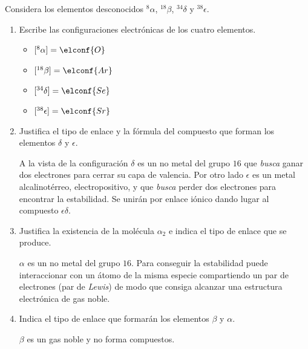 \documentclass[a4paper,14pt]{extarticle}
\begin{document}
\begin{enumerate}
    Considera los elementos desconocidos $^{8}\alpha$, $^{18}\beta$, $^{34}\delta$ y $^{38}\epsilon.$ 
    	\begin{enumerate}[label=\alph*)]
    		\item Escribe las configuraciones electrónicas de los cuatro elementos. 
    		\begin{mdframed}[backgroundcolor=brown!10]  
    				\begin{itemize}
    					\item $[^8\alpha]=\elconf{O}$
    					\item $[^{18}\beta]=\elconf{Ar}$
    					\item $[^{34}\delta]=\elconf{Se}$
    					\item $[^{38}\epsilon]=\elconf{Sr}$
    				\end{itemize}
    			\end{mdframed}
    		\item Justifica el tipo de enlace y la fórmula del compuesto que forman los elementos $\delta$ y $\epsilon$.
    		\begin{mdframed}[backgroundcolor=brown!10]  
    		A la vista de la configuración $\delta$ es un no metal del grupo $16$ que \textit{busca} ganar dos electrones para cerrar su capa de valencia.   		
    		 Por otro lado $\epsilon$ es un metal alcalinotérreo, electropositivo, y que \textit{busca} perder dos electrones para encontrar la estabilidad. 	Se unirán por enlace iónico dando lugar al compuesto $\epsilon\delta$.
    		 
    		\end{mdframed}
    		\item Justifica la existencia de la molécula $\alpha_2$ e indica el tipo de enlace que se produce.
    		\begin{mdframed}[backgroundcolor=brown!10]  
    		$\alpha$ es un no metal del grupo $16$. Para conseguir la estabilidad puede interaccionar con un átomo de la misma especie compartiendo un par de electrones (par de \textit{Lewis}) de modo que consiga alcanzar una estructura electrónica de gas noble.
    		\end{mdframed}
    		\item Indica el tipo de enlace que formarán los elementos $\beta$ y $\alpha$.
    		\begin{mdframed}[backgroundcolor=brown!10]  
    		$\beta$ es un gas noble y no forma compuestos.
    		\end{mdframed}
    	\end{enumerate}
   

\end{enumerate}
\end{document}
